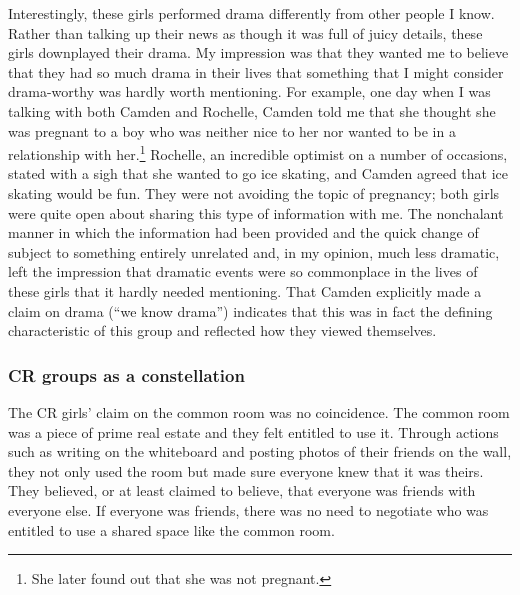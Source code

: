 Interestingly, these girls performed drama differently from other people I know.  Rather than talking up their news as though it was full of juicy details, these girls downplayed their drama.  My impression was that they wanted me to believe that they had so much drama in their lives that something that I might consider drama-worthy was hardly worth mentioning.  For example, one day when I was talking with both Camden and Rochelle, Camden told me that she thought she was pregnant to a boy who was neither nice to her nor wanted to be in a relationship with her.\footnote{She later found out that she was not pregnant.}  Rochelle, an incredible optimist on a number of occasions, stated with a sigh that she wanted to go ice skating, and Camden agreed that ice skating would be fun.  They were not avoiding the topic of pregnancy; both girls were quite open about sharing this type of information with me.  The nonchalant manner in which the information had been provided and the quick change of subject to something entirely unrelated and, in my opinion, much less dramatic, left the impression that dramatic events were so commonplace in the lives of these girls that it hardly needed mentioning.  That Camden explicitly made a claim on drama (``we know drama'') indicates that this was in fact the defining characteristic of this group and reflected how they viewed themselves.



\subsubsection{CR groups as a constellation}
  
The CR girls' claim on the common room was no coincidence.  The common room was a piece of prime real estate and they felt entitled to use it.  Through actions such as writing on the whiteboard and posting photos of their friends on the wall, they not only used the room but made sure everyone knew that it was theirs.  They believed, or at least claimed to believe, that everyone was friends with everyone else.  If everyone was friends, there was no need to negotiate who was entitled to use a shared space like the common room.

